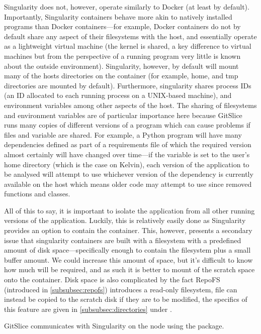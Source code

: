 \documentclass[11pt]{article}
\begin{document}
    Singularity does not, however, operate similarly to Docker (at least by default).
    Importantly, Singularity containers behave more akin to natively installed programs than Docker containers---for example, Docker containers do not by default share any aspect of their filesystems with the host, and essentially operate as a lightweight virtual machine (the kernel is shared, a key difference to virtual machines but from the perspective of a running program very little is known about the outside environment).
    Singularity, however, by default will mount many of the hosts directories on the container (for example, home, and tmp directories are mounted by default).
    Furthermore, singularity shares process IDs (an ID allocated to each running process on a UNIX-based machine), and environment variables among other aspects of the host.
    The sharing of filesystems and environment variables are of particular importance here because GitSlice runs many copies of different versions of a program which can cause problems if files and variable are shared.
    For example, a Python program will have many dependencies defined as part of a requirements file of which the required version almost certainly will have changed over time---if the  variable is set to the user's home directory (which is the case on Kelvin), each version of the application to be analysed will attempt to use whichever version of the dependency is currently available on the host which means older code may attempt to use since removed functions and classes.

    All of this to say, it is important to isolate the application from all other running versions of the application.
    Luckily, this is relatively easily done as Singularity provides an option to contain the container.
    This, however, presents a secondary issue that singularity containers are built with a filesystem with a predefined amount of disk space---specifically enough to contain the filesystem plus a small buffer amount.
    We could increase this amount of space, but it's difficult to know how much will be required, and as such it is better to mount of the scratch space onto the container.
    Disk space is also complicated by the fact RepoFS (introduced in \autoref{subsubsec:repofs}) introduces a read-only filesystem, file can instead be copied to the scratch disk if they are to be modified, the specifics of this feature are given in \autoref{subsubsec:directories} under .

    GitSlice communicates with Singularity on the node using the  package.
\end{document}
